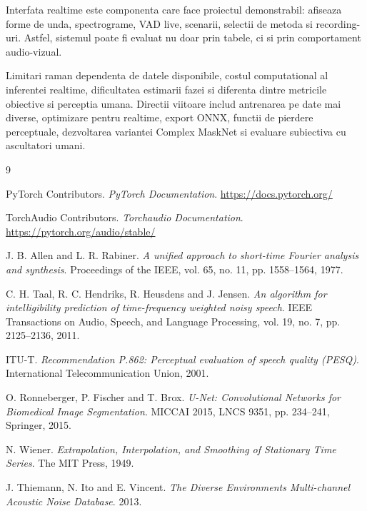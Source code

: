 \documentclass[12pt,a4paper]{report}
\begin{document}
Interfata realtime este componenta care face proiectul demonstrabil: afiseaza
forme de unda, spectrograme, VAD live, scenarii, selectii de metoda si
recording-uri. Astfel, sistemul poate fi evaluat nu doar prin tabele, ci si
prin comportament audio-vizual.

Limitari raman dependenta de datele disponibile, costul computational al
inferentei realtime, dificultatea estimarii fazei si diferenta dintre metricile
obiective si perceptia umana. Directii viitoare includ antrenarea pe date mai
diverse, optimizare pentru realtime, export ONNX, functii de pierdere
perceptuale, dezvoltarea variantei Complex MaskNet si evaluare subiectiva cu
ascultatori umani.

\begin{thebibliography}{9}
\small

PyTorch Contributors.
\textit{PyTorch Documentation}.
\url{https://docs.pytorch.org/}

TorchAudio Contributors.
\textit{Torchaudio Documentation}.
\url{https://pytorch.org/audio/stable/}

J. B. Allen and L. R. Rabiner.
\textit{A unified approach to short-time Fourier analysis and synthesis}.
Proceedings of the IEEE, vol. 65, no. 11, pp. 1558--1564, 1977.

C. H. Taal, R. C. Hendriks, R. Heusdens and J. Jensen.
\textit{An algorithm for intelligibility prediction of time-frequency weighted
noisy speech}. IEEE Transactions on Audio, Speech, and Language Processing,
vol. 19, no. 7, pp. 2125--2136, 2011.

ITU-T.
\textit{Recommendation P.862: Perceptual evaluation of speech quality (PESQ)}.
International Telecommunication Union, 2001.

O. Ronneberger, P. Fischer and T. Brox.
\textit{U-Net: Convolutional Networks for Biomedical Image Segmentation}.
MICCAI 2015, LNCS 9351, pp. 234--241, Springer, 2015.

N. Wiener.
\textit{Extrapolation, Interpolation, and Smoothing of Stationary Time Series}.
The MIT Press, 1949.

J. Thiemann, N. Ito and E. Vincent.
\textit{The Diverse Environments Multi-channel Acoustic Noise Database}.
2013.

\end{thebibliography}
\end{document}
